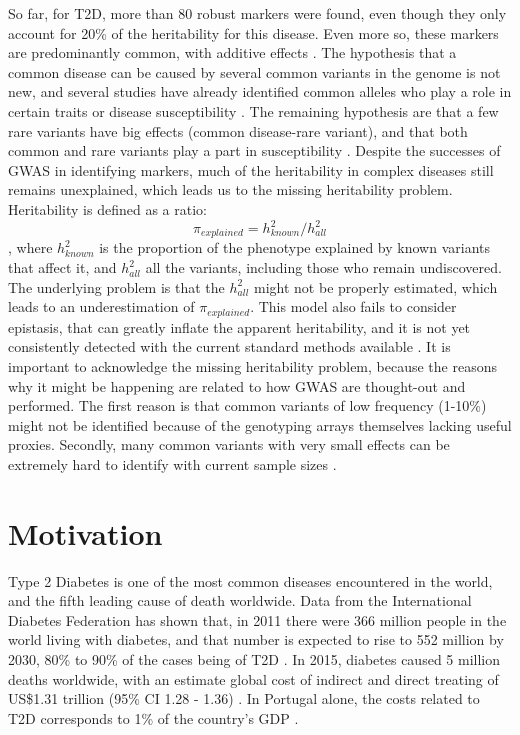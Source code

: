 So far, for \gls{T2D}, more than 80 robust markers were found, even though they only account for 20\% of the heritability for this disease. Even more so, these markers are predominantly common, with additive effects \cite{fuchsberger2016genetic}. The hypothesis that a common disease can be caused by several common variants in the genome is not new, and several studies have already identified common alleles who play a role in certain traits or disease susceptibility \cite{yang2010common, fuchsberger2016genetic, bush2012genome, reich2001allelic}. The remaining hypothesis are that a few rare variants have big effects (common disease-rare variant), and that both common and rare variants play a part in susceptibility \cite{prasad2015genetics, sanghera2012type}. Despite the successes of GWAS in identifying markers, much of the heritability in complex diseases still remains unexplained, which leads us to the missing heritability problem.\\
Heritability is defined as a ratio:
\begin{equation}
	\pi_{explained} = h^2_{known} / h^2_{all}
\end{equation}
, where $h^2_{known}$ is the proportion of the phenotype explained by known variants that affect it, and $h^2_{all}$ all the variants, including those who remain undiscovered. The underlying problem is that the $h^2_{all}$ might not be properly estimated, which leads to an underestimation of $\pi_{explained}$. This model also fails to consider epistasis, that can greatly inflate the apparent heritability, and it is not yet consistently detected with the current standard methods available \cite{zuk2012mystery}. It is important to acknowledge the missing heritability problem, because the reasons why it might be happening are related to how GWAS are thought-out and performed. The first reason is that common variants of low frequency (1-10\%) might not be identified because of the genotyping arrays themselves lacking useful proxies. Secondly, many common variants with very small effects can be extremely hard to identify with current sample sizes \cite{lander2011initial, huyghe2013exome}.


\section{Motivation}

Type 2 Diabetes is one of the most common diseases encountered in the world, and the fifth leading cause of death worldwide. Data from the International Diabetes Federation has shown that, in 2011 there were 366 million people in the world living with diabetes, and that number is expected to rise to 552 million by 2030, 80\% to 90\% of the cases being of T2D \cite{sanghera2012type, prasad2015genetics}. In 2015, diabetes caused 5 million deaths worldwide, with an estimate global cost of indirect and direct treating of US\$1.31 trillion (95\% CI 1.28 - 1.36) \cite{bommer2017global}. In Portugal alone, the costs related to \gls{T2D} corresponds to 1\% of the country's \gls{GDP} \cite{da2016diabetes}.

